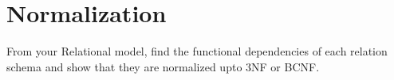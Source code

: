 \section{Normalization}\label{sec:norm}
From your Relational model, find the functional dependencies of each relation schema and show that they are normalized upto 3NF or BCNF.
\clearpage